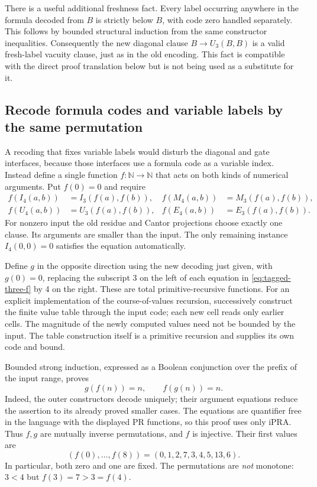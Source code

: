 There is a useful additional freshness fact.  Every label occurring
anywhere in the formula decoded from $B$ is strictly below $B$, with code
zero handled separately.  This follows by bounded structural induction
from the same constructor inequalities.  Consequently the new diagonal
clause $B\to U_3(B,B)$ is a valid fresh-label vacuity clause, just as in
the old encoding.  This fact is compatible with the direct proof
translation below but is not being used as a substitute for it.

\subsection{Recode formula codes and variable labels by the same permutation}

A recoding that fixes variable labels would disturb the diagonal and gate
interfaces, because those interfaces use a formula code as a variable
index.  Instead define a single function $f:\mathbb N\to\mathbb N$ that
acts on both kinds of numerical arguments.  Put $f(0)=0$ and require
\[
\begin{aligned}
 f(I_4(a,b))&=I_3(f(a),f(b)),&
 f(M_4(a,b))&=M_3(f(a),f(b)),\\
 f(U_4(a,b))&=U_3(f(a),f(b)),&
 f(E_4(a,b))&=E_3(f(a),f(b)).
\end{aligned}
\tag{F}\label{eq:tagged-three-f}
\]
For nonzero input the old residue and Cantor projections choose exactly
one clause.  Its arguments are smaller than the input.  The only
remaining instance $I_4(0,0)=0$ satisfies the equation automatically.

Define $g$ in the opposite direction using the new decoding just given,
with $g(0)=0$, replacing the subscript 3 on the left of each equation in
\eqref{eq:tagged-three-f} by 4 on the right.  These are total
primitive-recursive functions.  For an explicit implementation of the
course-of-values recursion, successively construct the finite value table
through the input code; each new cell reads only earlier cells.  The
magnitude of the newly computed values need not be bounded by the input.
The table construction itself is a primitive recursion and supplies its
own code and bound.

Bounded strong induction, expressed as a Boolean conjunction over the
prefix of the input range, proves
\[
 g(f(n))=n,\qquad f(g(n))=n.
\tag{Inv}\label{eq:tagged-three-inverse}
\]
Indeed, the outer constructors decode uniquely; their argument equations
reduce the assertion to its already proved smaller cases.  The equations
are quantifier free in the language with the displayed PR functions, so
this proof uses only iPRA.  Thus $f,g$ are mutually inverse permutations,
and $f$ is injective.  Their first values are
\[
 (f(0),\ldots,f(8))=(0,1,2,7,3,4,5,13,6).
\]
In particular, both zero and one are fixed.  The permutations are
\emph{not} monotone: $3<4$ but $f(3)=7>3=f(4)$.

